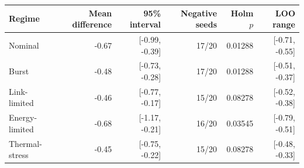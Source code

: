 \begin{tabular}{lrrrrr}
\toprule
Regime & Mean difference & 95\% interval & Negative seeds & Holm $p$ & LOO range \\
\midrule
Nominal & -0.67 & [-0.99, -0.39] & 17/20 & 0.01288 & [-0.71, -0.55] \\
Burst & -0.48 & [-0.73, -0.28] & 17/20 & 0.01288 & [-0.51, -0.37] \\
Link-limited & -0.46 & [-0.77, -0.17] & 15/20 & 0.08278 & [-0.52, -0.38] \\
Energy-limited & -0.68 & [-1.17, -0.21] & 16/20 & 0.03545 & [-0.79, -0.51] \\
Thermal-stress & -0.45 & [-0.75, -0.22] & 15/20 & 0.08278 & [-0.48, -0.33] \\
\bottomrule
\end{tabular}